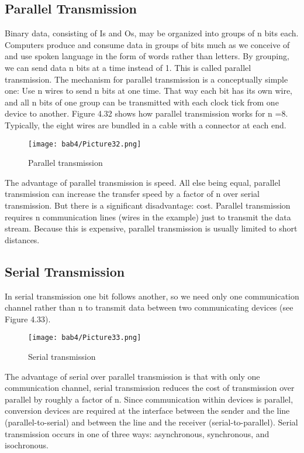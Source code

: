 \subsection{Parallel Transmission}
Binary data, consisting of Is and Os, may be organized into groups of n bits each. Computers produce and consume data in groups of bits much as we conceive of and use spoken language in the form of words rather than letters. By grouping, we can send data n bits at a time instead of 1. This is called parallel transmission. The mechanism for parallel transmission is a conceptually simple one: Use n wires to send n bits at one time. That way each bit has its own wire, and all n bits of one group can be transmitted with each clock tick from one device to another. Figure 4.32 shows how parallel transmission works for n =8. Typically, the eight wires are bundled in a cable with a connector at each end.

\begin{figure}
  \centering
  \texttt{[image: bab4/Picture32.png]}
  \caption{Parallel transmission}
  \label{fig4:32}
\end{figure}

The advantage of parallel transmission is speed. All else being equal, parallel transmission can increase the transfer speed by a factor of n over serial transmission. But there is a significant disadvantage: cost. Parallel transmission requires n communication lines (wires in the example) just to transmit the data stream. Because this is expensive, parallel transmission is usually limited to short distances.

\subsection{Serial Transmission}
In serial transmission one bit follows another, so we need only one communication channel rather than n to transmit data between two communicating devices (see Figure 4.33).

\begin{figure}
  \centering
  \texttt{[image: bab4/Picture33.png]}
  \caption{Serial transmission}
  \label{fig4:33}
\end{figure}

The advantage of serial over parallel transmission is that with only one communication channel, serial transmission reduces the cost of transmission over parallel by roughly a factor of n. Since communication within devices is parallel, conversion devices are required at the interface between the sender and the line (parallel-to-serial) and between the line and the receiver (serial-to-parallel). Serial transmission occurs in one of three ways: asynchronous, synchronous, and isochronous.

